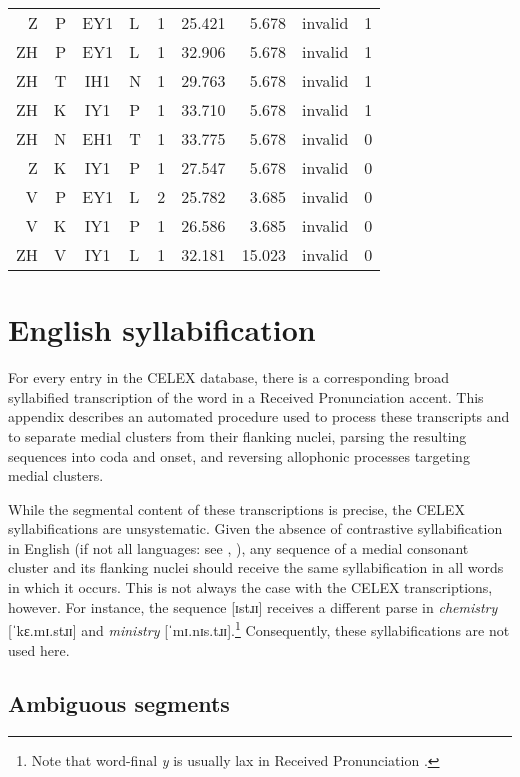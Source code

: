 \documentclass[12pt]{article}
\begin{document}
\begin{longtable}{r@{ }r@{ }c@{ }l@{ } rrrrr}
 Z & P & EY1 & L & 1 & 25.421 &  5.678 & invalid & 1 \\
ZH & P & EY1 & L & 1 & 32.906 &  5.678 & invalid & 1 \\
ZH & T & IH1 & N & 1 & 29.763 &  5.678 & invalid & 1 \\
ZH & K & IY1 & P & 1 & 33.710 &  5.678 & invalid & 1 \\
ZH & N & EH1 & T & 1 & 33.775 &  5.678 & invalid & 0 \\
 Z & K & IY1 & P & 1 & 27.547 &  5.678 & invalid & 0 \\
 V & P & EY1 & L & 2 & 25.782 &  3.685 & invalid & 0 \\
 V & K & IY1 & P & 1 & 26.586 &  3.685 & invalid & 0 \\
ZH & V & IY1 & L & 1 & 32.181 & 15.023 & invalid & 0 \\
\bottomrule
\end{longtable}

\section{English syllabification}
\label{syllabification}

For every entry in the CELEX database, there is a corresponding broad syllabified transcription of the word in a Received Pronunciation accent. This appendix describes an automated procedure used to process these transcripts and to separate medial clusters from their flanking nuclei, parsing the resulting sequences into coda and onset, and reversing allophonic processes targeting medial clusters.

While the segmental content of these transcriptions is precise, the CELEX syllabifications are unsystematic. Given the absence of contrastive syllabification in English (if not all languages: see \citealp[221]{Blevins1995}, \citealp{Elfner2006}), any sequence of a medial consonant cluster and its flanking nuclei should receive the same syllabification in all words in which it occurs. This is not always the case with the CELEX transcriptions, however. For instance, the sequence [ɪstɹɪ] receives a different parse in \emph{chemistry} [ˈkɛ.mɪ.stɹɪ] and \emph{ministry} [ˈmɪ.nɪs.tɹɪ].\footnote{Note that word-final \emph{y} is usually lax in Received Pronunciation \citep[][II.294]{AOE}.} Consequently, these syllabifications are not used here.

\subsection{Ambiguous segments}
\end{document}
